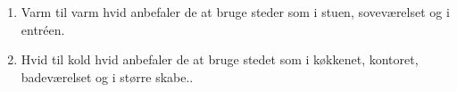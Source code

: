 \begin{enumerate}
\item Varm til varm hvid anbefaler de at bruge steder som i stuen, soveværelset og i entréen.
\item Hvid til kold hvid anbefaler de at bruge stedet som i køkkenet, kontoret, badeværelset og i større skabe.\cite{varm_kold}.
\end{enumerate}




